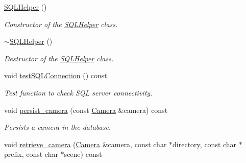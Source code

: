 \begin{DoxyCompactItemize}
\item 
\mbox{\label{classdto_1_1_s_q_l_helper_a4d57dbef6437f18e649382da9121e5ec}} 
\mbox{\hyperlink{classdto_1_1_s_q_l_helper_a4d57dbef6437f18e649382da9121e5ec}{S\+Q\+L\+Helper}} ()
\begin{DoxyCompactList}\small\item\em Constructor of the \mbox{\hyperlink{classdto_1_1_s_q_l_helper}{S\+Q\+L\+Helper}} class. \end{DoxyCompactList}\item 
\mbox{\label{classdto_1_1_s_q_l_helper_aee0b3df207398a74da2305a69577cb98}} 
\mbox{\hyperlink{classdto_1_1_s_q_l_helper_aee0b3df207398a74da2305a69577cb98}{$\sim$\+S\+Q\+L\+Helper}} ()
\begin{DoxyCompactList}\small\item\em Destructor of the \mbox{\hyperlink{classdto_1_1_s_q_l_helper}{S\+Q\+L\+Helper}} class. \end{DoxyCompactList}\item 
\mbox{\label{classdto_1_1_s_q_l_helper_a0377f574d8d394022386cd99d4dfc9ef}} 
void \mbox{\hyperlink{classdto_1_1_s_q_l_helper_a0377f574d8d394022386cd99d4dfc9ef}{test\+S\+Q\+L\+Connection}} () const
\begin{DoxyCompactList}\small\item\em Test function to check S\+QL server connectivity. \end{DoxyCompactList}\item 
\mbox{\label{classdto_1_1_s_q_l_helper_a33c72957c41dd47da02b6ddd6acdf716}} 
void \mbox{\hyperlink{classdto_1_1_s_q_l_helper_a33c72957c41dd47da02b6ddd6acdf716}{persist\+\_\+camera}} (const \mbox{\hyperlink{structdto_1_1_camera}{Camera}} \&camera) const
\begin{DoxyCompactList}\small\item\em Persists a camera in the database. \end{DoxyCompactList}\item 
\mbox{\label{classdto_1_1_s_q_l_helper_ab4126980a2803f5682b76da106e157e1}} 
void \mbox{\hyperlink{classdto_1_1_s_q_l_helper_ab4126980a2803f5682b76da106e157e1}{retrieve\+\_\+camera}} (\mbox{\hyperlink{structdto_1_1_camera}{Camera}} \&camera, const char $\ast$directory, const char $\ast$prefix, const char $\ast$scene) const

\end{DoxyCompactItemize}
